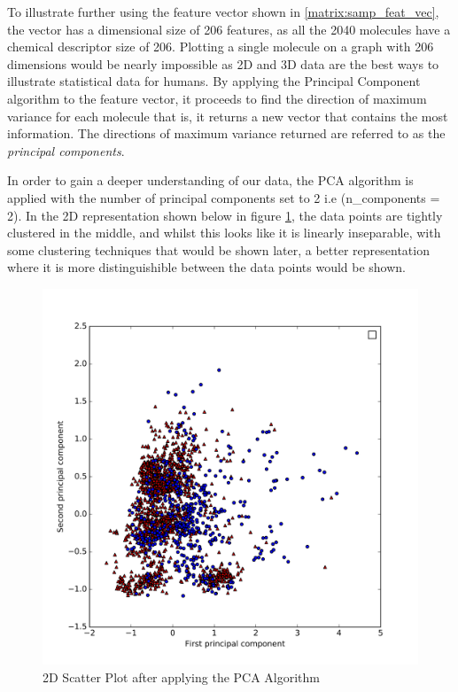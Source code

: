 \documentclass[a4paper,12pt]{report}
\begin{document}
		To illustrate further using the feature vector shown in \ref{matrix:samp_feat_vec}, the vector has a dimensional size of 206 features, as all the 2040 molecules have a chemical descriptor size of 206. Plotting a single molecule on a graph with 206 dimensions would be nearly impossible as 2D and 3D data are the best ways to illustrate statistical data for humans. By applying the Principal Component algorithm to the feature vector, it proceeds to find the direction of maximum variance for each molecule that is, it returns a new vector that contains the most information. The directions of maximum variance returned are referred to as the \textit{principal components}.
		
		In order to gain a deeper understanding of our data, the PCA algorithm is applied with the number of principal components set to 2 i.e (n\_components = 2). In the 2D representation shown below in figure \ref{fig:scatter_pca_2D}, the data points are tightly clustered in the middle, and whilst this looks like it is linearly inseparable, with some clustering techniques that would be shown later, a better representation where it is more distinguishible between the data points would be shown.
		\begin{figure}[H]
			\centering
			\includegraphics[width=\textwidth,scale=1,totalheight=0.5\textheight]{images/scatter_pca}
			\caption{2D Scatter Plot after applying the PCA Algorithm}
			\label{fig:scatter_pca_2D}
		\end{figure}
	
\end{document}
